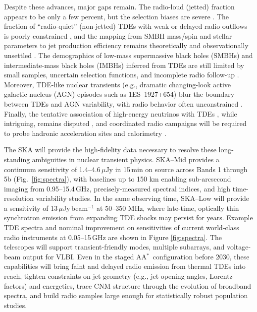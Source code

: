 \documentclass[a4paper,11pt]{article}
\newcommand{\AAstar}{AA$^{\ast}$}
\begin{document}
Despite these advances, major gaps remain. The radio-loud (jetted) fraction appears to be only a few percent, but the selection biases are severe \citep{Alexander2020,vanVelzen2021}. The fraction of ``radio-quiet'' (non-jetted) TDEs with weak or delayed radio outflows is poorly constrained \citep{Goodwin2022,Cendes2022}, and the mapping from SMBH mass/spin and stellar parameters to jet production efficiency remains theoretically and observationally unsettled \citep{Tchekhovskoy2014,BlandfordZnajek1977}. The demographics of low-mass supermassive black holes (SMBHs) and intermediate-mass black holes (IMBHs) inferred from TDEs are still limited by small samples, uncertain selection functions, and incomplete radio follow-up \citep{Wevers2017,Mockler2019,Lin2018}. Moreover, TDE-like nuclear transients (e.g., dramatic changing-look active galactic nucleus (AGN) episodes such as 1ES~1927+654) blur the boundary between TDEs and AGN variability, with radio behavior often unconstrained \citep{Trakhtenbrot2019,Ricci2020}. Finally, the tentative association of high-energy neutrinos with TDEs \citep{Stein2021,Reusch2022}, while intriguing, remains disputed \citep{Cendes2021}, and coordinated radio campaigns will be required to probe hadronic acceleration sites and calorimetry \citep{Mohan2022}.

The SKA will provide the high-fidelity data necessary to resolve these long-standing ambiguities in nuclear transient physics. 
SKA--Mid provides a continuum sensitivity of 1.4--4.6\,$\mu$Jy in 15\,min on source across Bands 1 through 5b (Fig.~\ref{fig:spectra}), with baselines up to 150 km enabling sub-arcsecond imaging from 0.95--15.4\,GHz, precisely-measured spectral indices, and high time-resolution variability studies. 
In the same observing time, SKA--Low will provide a sensitivity of 13\,$\mu$Jy\,beam$^{-1}$ at 50--350 MHz, where late-time, optically thin synchrotron emission from expanding TDE shocks may persist for years. Example TDE spectra and nominal improvement on sensitivities of current world-class radio instruments at 0.05--15\,GHz are shown in Figure \ref{fig:spectra}. 
The telescopes will support transient-friendly modes, multiple subarrays, and voltage-beam output for VLBI. Even in the staged \AAstar\ configuration before 2030, these capabilities will bring faint and delayed radio emission from thermal TDEs into reach, tighten constraints on jet geometry (e.g., jet opening angles, Lorentz factors) and energetics, trace CNM structure through the evolution of broadband spectra, and build radio samples large enough for statistically robust population studies.
\end{document}
